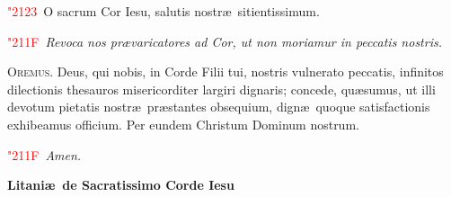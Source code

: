 \documentclass[12pt]{article}\errorcontextlines=9
\newcommand\centerheading[1]{%
\begin{center}
\normalsize\textbf{#1}\\%
\end{center}
}
\newcommand\versic[1]{%
\textcolor{red}{\char"2123\ }#1%
}
\newcommand\response[1]{%
\textcolor{red}{\char"211F\ }#1%
}
\begin{document}
\begin{multicols}{2}
\versic O sacrum Cor Iesu, salutis nostr\ae\ sitientissimum.

\response \textit{Revoca nos pr\ae varicatores ad Cor, ut non moriamur in peccatis nostris.}

\bigskip

\lettrine{O}{\color{red}remus}. Deus, qui nobis, in Corde Filii tui, nostris vulnerato peccatis, 
infinitos dilectionis thesauros misericorditer largiri dignaris; concede, qu\ae sumus, 
ut illi devotum pietatis nostr\ae\ pr\ae stantes obsequium, dign\ae\ quoque satisfactionis exhibeamus officium. 
Per eundem Christum Dominum nostrum.

\response \textit{Amen.}

\end{multicols}

\newpage


\centerheading{\LARGE{\color{red}Litani\ae\ de Sacratissimo Corde Iesu}}

\bigskip
\end{document}
